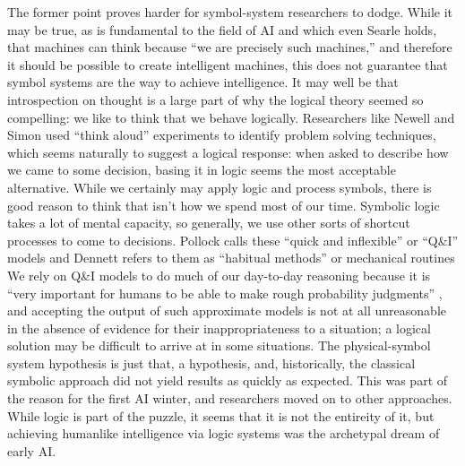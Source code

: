 The former point proves harder for symbol-system researchers to dodge.
While it may be true, as is 
fundamental to the field of AI and which even Searle holds, that
machines can think because ``we are precisely such machines,'' \cite[p.
83]{chineseSearle} and therefore it should be possible to create
intelligent machines, this does not guarantee that symbol systems are
the way to achieve intelligence. It may well be that introspection on
thought is a large part of why the logical theory seemed so
compelling:  we like to think that we behave logically. Researchers like Newell
and Simon used ``think aloud'' experiments to identify problem solving
techniques, \cite[Ch. 10]{mccorduck} which seems naturally to suggest a
logical response:  when
asked to describe how we came to some decision, basing it in logic
seems the most acceptable alternative. While we certainly may apply logic
and process symbols, there is good reason to think that isn't how we
spend most of our time. Symbolic logic takes a lot of mental capacity,
so generally, we use other sorts of shortcut processes to come to
decisions. Pollock calls these ``quick and inflexible'' or ``Q\&I''
models \cite[p. 120]{pollock} and Dennett refers to them as ``habitual methods'' or
mechanical routines \cite[p. 157]{dennett} We rely on Q\&I models to do
much of our day-to-day reasoning because it is ``very important for
humans to be able to make rough probability judgments'' \cite[p.
  120]{pollock}, and accepting the output of such approximate models
is not at all unreasonable in the absence of evidence for their
inappropriateness to a situation; a logical solution may be difficult
to arrive at in some situations. The physical-symbol system hypothesis
is just that, a hypothesis, and, historically, the classical symbolic
approach did not yield results as quickly as expected. This was part
of the reason for the first AI winter, and researchers moved on to
other approaches. While logic is part of the puzzle, it seems that it
is not the entireity of it, but achieving humanlike intelligence via logic
systems was the archetypal dream of early AI.


